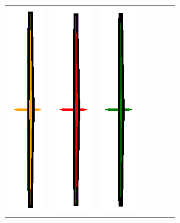 \begin{table}[!h]
\begin{center}
\begin{tabular}{C{2cm} C{3.8cm} C{1.25cm} C{1.6cm} C{1.6cm} C{1.6cm} C{1.6cm}}
    \includegraphics[trim={10.5cm 1.5cm 10.5cm 1.5cm},clip,scale=0.7]{margins.eps} &
    \includegraphics[trim={10.5cm 1.5cm 10.5cm 1.5cm},clip,scale=0.7]{box.eps} &
    \includegraphics[trim={10.5cm 1.5cm 10.5cm 1.5cm},clip,scale=0.7]{elliptical.eps} \\

\end{tabular}
\end{center}
\end{table}
